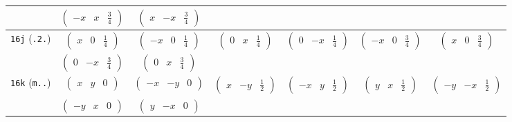 \documentclass[fleqn,9pt,landscape]{jsarticle}
\begin{document}
\begin{center}
\begin{longtable}{ccccccc}
& $ \begin{pmatrix} - x & x & \frac{3}{4} \end{pmatrix} $ & $ \begin{pmatrix} x & - x & \frac{3}{4} \end{pmatrix} $ & $  $ & $  $ & $  $ & $  $ \\ \hline
{\tt 16j} ({\tt .2.}) & $ \begin{pmatrix} x & 0 & \frac{1}{4} \end{pmatrix} $ & $ \begin{pmatrix} - x & 0 & \frac{1}{4} \end{pmatrix} $ & $ \begin{pmatrix} 0 & x & \frac{1}{4} \end{pmatrix} $ & $ \begin{pmatrix} 0 & - x & \frac{1}{4} \end{pmatrix} $ & $ \begin{pmatrix} - x & 0 & \frac{3}{4} \end{pmatrix} $ & $ \begin{pmatrix} x & 0 & \frac{3}{4} \end{pmatrix} $ \\
& $ \begin{pmatrix} 0 & - x & \frac{3}{4} \end{pmatrix} $ & $ \begin{pmatrix} 0 & x & \frac{3}{4} \end{pmatrix} $ & $  $ & $  $ & $  $ & $  $ \\ \hline
{\tt 16k} ({\tt m..}) & $ \begin{pmatrix} x & y & 0 \end{pmatrix} $ & $ \begin{pmatrix} - x & - y & 0 \end{pmatrix} $ & $ \begin{pmatrix} x & - y & \frac{1}{2} \end{pmatrix} $ & $ \begin{pmatrix} - x & y & \frac{1}{2} \end{pmatrix} $ & $ \begin{pmatrix} y & x & \frac{1}{2} \end{pmatrix} $ & $ \begin{pmatrix} - y & - x & \frac{1}{2} \end{pmatrix} $ \\
& $ \begin{pmatrix} - y & x & 0 \end{pmatrix} $ & $ \begin{pmatrix} y & - x & 0 \end{pmatrix} $ & $  $ & $  $ & $  $ & $  $ \\ \hline

\end{longtable}
\end{center}
\end{document}
